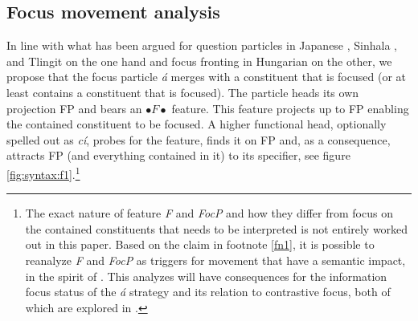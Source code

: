 \documentclass[output=paper,
modfonts
]{langscibook}
\begin{document}
\subsection{Focus movement analysis} \label{subsec:analysis}
In line with what has been argued for question particles in Japanese \citep{Hagstrom1998}, Sinhala \citep{Kishimoto2005}, and Tlingit \citep{Cable2010} on the one hand and focus fronting in Hungarian \citep{Horvath2007,Horvath2010,Horvath2013} on the other, we propose that the focus particle {\em \'a} merges with a constituent that is focused (or at least contains a constituent that is focused). The particle heads its own projection FP and bears an {\small $\bullet F \bullet$} feature. This feature projects up to FP enabling the contained constituent to be focused. A higher functional head, optionally spelled out as {\em c\'i}, probes for the feature, finds it on FP and, as a consequence, attracts FP (and everything contained in it) to its specifier, see figure \ref{fig:syntax:f1}.\footnote{The exact nature of feature {\em F} and {\em FocP} and how they differ from focus on the contained constituents that needs to be interpreted is not entirely worked out in this paper. Based on the claim in footnote \ref{fn1}, it is possible to reanalyze {\em F} and {\em FocP} as triggers for movement that have a semantic impact, in the spirit of \citet{Horvath2007,Horvath2013}. This analyzes will have consequences for the information focus status of the {\em \'a} strategy and its relation to {contrastive focus}, both of which are explored in \citet{Driemeletal2017}.}
\end{document}
